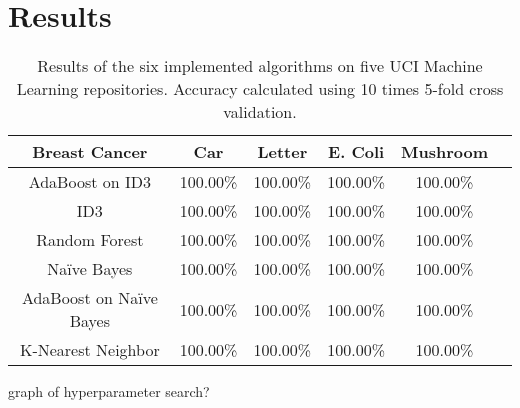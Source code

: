 \documentclass[11pt]{article}
\begin{document}
\section{Results}
\begin{table}
  \begin{tabular}{ |c|c|c|c|c|c| }
    \hline
    Breast Cancer           & Car      & Letter   & E. Coli  & Mushroom \\ \hline
    AdaBoost on ID3         & 100.00\% & 100.00\% & 100.00\% & 100.00\% \\ \hline
    ID3                     & 100.00\% & 100.00\% & 100.00\% & 100.00\% \\ \hline
    Random Forest           & 100.00\% & 100.00\% & 100.00\% & 100.00\% \\ \hline
    Naïve Bayes             & 100.00\% & 100.00\% & 100.00\% & 100.00\% \\ \hline
    AdaBoost on Naïve Bayes & 100.00\% & 100.00\% & 100.00\% & 100.00\% \\ \hline
    K-Nearest Neighbor      & 100.00\% & 100.00\% & 100.00\% & 100.00\% \\ \hline
  \end{tabular}
  \caption{Results of the six implemented algorithms on five UCI Machine Learning repositories. Accuracy calculated using 10 times 5-fold cross validation.}
\end{table}

graph of hyperparameter search?



\end{document}
